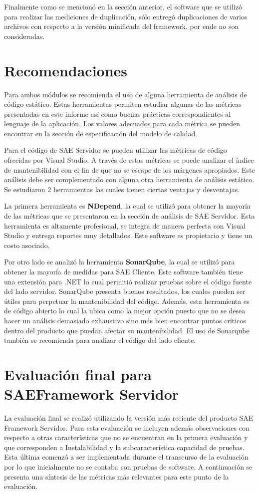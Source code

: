Finalmente como se mencionó en la sección anterior, el software que se utilizó
para realizar las mediciones de duplicación, sólo entregó duplicaciones de
varios archivos con respecto a la versión minificada del framework, por ende
no son consideradas.

\section{Recomendaciones}

Para ambos módulos se recomienda el uso de alguna herramienta de análisis
de código estático. Estas herramientas permiten estudiar algunas de las métricas
presentadas en este informe así como buenas prácticas correspondientes al
lenguaje de la aplicación.
Los valores adecuados para cada métrica se pueden encontrar en la
sección de especificación del modelo de calidad.

Para el código de SAE Servidor se pueden utilizar las métricas de código
ofrecidas por Visual Studio. A través de estas métricas se puede analizar el
índice de mantenibilidad con el fin de que no se escape de los márgenes
apropiados. Este análisis debe ser complementado con alguna otra herramienta
de análisis estático. Se estudiaron 2 herramientas las cuales tienen ciertas
ventajas y desventajas.

La primera herramienta es \textbf{NDepend}, la cual se utilizó para obtener la mayoría
de las métricas que se presentaron en la sección de análisis de SAE Servidor.
Esta herramienta es altamente profesional, se integra de manera perfecta con
Visual Studio y entrega reportes muy detallados. Este software es propietario
y tiene un costo asociado.

Por otro lado se analizó la herramienta \textbf{SonarQube}, la cual se utilizó para
obtener la mayoría de medidas para SAE Cliente. Este software también tiene
una extensión para .NET lo cual permitió realizar pruebas sobre el código
fuente del lado servidor.
SonarQube presenta buenos resultados, los cuales pueden ser útiles para
perpetuar la mantenibilidad del código. Además, esta herramienta es de código
abierto lo cual la ubica como la mejor opción puesto que no se desea hacer un
análisis demasiado exhaustivo sino más bien encontrar puntos críticos dentro
del producto que puedan afectar su mantenibilidad. El uso de Sonarqube también
se recomienda para analizar el código del lado cliente.

\section{Evaluación final para SAEFramework Servidor}
La evaluación final se realizó utilizando la versión más reciente del producto
SAE Framework Servidor. Para esta evaluación se incluyen además observaciones
con respecto a otras características que no se encuentran en la primera evaluación y
que corresponden a Instalabilidad y la subcaracterística capacidad de pruebas.
Esta última comenzó a ser implementada durante el transcurso de la evaluación
por lo que inicialmente no se contaba con pruebas de software.
A continuación se presenta una síntesis de las métricas más relevantes para
este punto de la evaluación.

